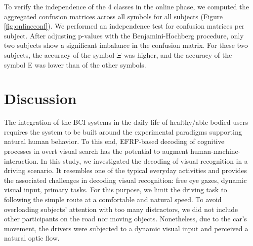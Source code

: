 \documentclass[12pt]{iopart}
\begin{document}
To verify the independence of the 4 classes in the online phase,
we computed the aggregated confusion matrices across all symbols for all subjects (Figure \ref{fig:onlineconf}).
We performed an independence test for confusion matrices per subject.
After adjusting p-values with the Benjamini-Hochberg procedure,
only two subjects show a significant imbalance in the
confusion matrix.
For these two subjects, the accuracy of the symbol $\Xi$ was higher,
and the accuracy of the symbol E was lower than of the other symbols.

\section{Discussion}
\label{sec:discussion}

The integration of the BCI systems in the daily life of 
healthy/able-bodied users requires the system 
to be built around the experimental paradigms
 supporting natural human behavior.
To this end, EFRP-based decoding of cognitive 
processes in overt visual search has the potential
to augment human-machine-interaction. 
In this study, we investigated the decoding of visual recognition in a driving scenario.
It resembles one of the typical everyday activities
and provides the associated challenges in decoding visual recognition:
free eye gazes, dynamic visual input, primary tasks.
For this purpose, we limit the driving task to following 
the simple route at a comfortable and natural speed.
To avoid overloading subjects' attention with too many distractors,
we did not include other participants on the road nor moving objects.
Nonetheless, due to the car's movement, the drivers
were subjected to a dynamic visual input and perceived a
natural optic flow.
\end{document}
